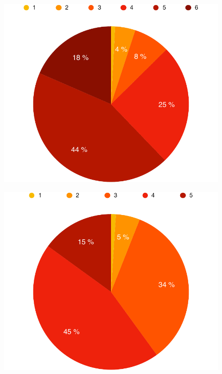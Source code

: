 \documentclass[a4paper]{article}
\begin{document}
        \begin{figure}[h]
            \centering
            \begin{minipage}{.5\textwidth}
                \centering
                \includegraphics[width=\textwidth]{assets/results/validity/rowsPerKnowledge}
                \label{fig:rowsPer:knowledge}
            \end{minipage}%
            \begin{minipage}{.5\textwidth}
                \centering
                \includegraphics[width=\textwidth]{assets/results/validity/knowledgeComparisonCite}
                \label{fig:rowsPer:knowledgeCite}
            \end{minipage}
            

\end{figure}
\end{document}
